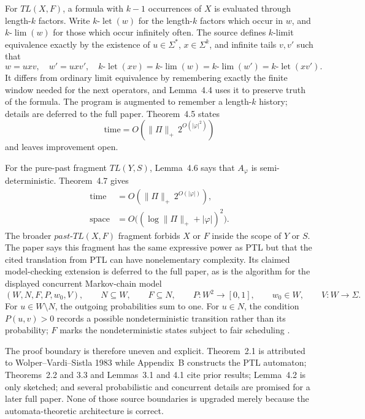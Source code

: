 For \(TL(X,F)\), a formula with \(k-1\) occurrences of \(X\) is evaluated
through length-\(k\) factors.  Write \(k\text{-}\operatorname{let}(w)\) for
the length-\(k\) factors which occur in \(w\), and
\(k\text{-}\operatorname{lim}(w)\) for those which occur infinitely often.
The source defines \(k\)-limit equivalence exactly by the existence of
\(u\in\Sigma^*\), \(x\in\Sigma^k\), and infinite tails \(v,v'\) such that
\[
 w=uxv,
 \quad
 w'=uxv',
 \quad
 k\text{-}\operatorname{let}(xv)
 =k\text{-}\operatorname{lim}(w)
 =k\text{-}\operatorname{lim}(w')
 =k\text{-}\operatorname{let}(xv').
\]
It differs from ordinary limit equivalence by remembering exactly the finite
window needed for the next operators, and Lemma~4.4 uses it to preserve truth
of the formula.  The program is augmented to remember a length-\(k\) history;
details are deferred to the full paper.  Theorem~4.5 states
\[
 \text{time}=O(\lVert\Pi\rVert_+\,2^{O(|\varphi|^2)})
\]
and leaves improvement open.

For the pure-past fragment \(TL(Y,S)\), Lemma~4.6 says that
\(A_\varphi\) is semi-deterministic.  Theorem~4.7 gives
\[
\begin{aligned}
 \text{time}&=O(\lVert\Pi\rVert_+\,2^{O(|\varphi|)}),\\
 \text{space}&=O\bigl((\log\lVert\Pi\rVert_++|\varphi|)^2\bigr).
\end{aligned}
\]
The broader \(past\text{-}TL(X,F)\) fragment forbids \(X\) or \(F\) inside
the scope of \(Y\) or \(S\).  The paper says this fragment has the same
expressive power as PTL but that the cited translation from PTL can have
nonelementary complexity.  Its claimed model-checking extension is deferred
to the full paper, as is the algorithm for the displayed concurrent
Markov-chain model
\[
 (W,N,F,P,w_0,V),
 \qquad
 N\subseteq W,
 \qquad
 F\subseteq N,
 \qquad
 P:W^2\to[0,1],
 \qquad
 w_0\in W,
 \qquad
 V:W\to\Sigma.
\]
For \(u\in W\setminus N\), the outgoing probabilities sum to one.  For
\(u\in N\), the condition \(P(u,v)>0\) records a possible nondeterministic
transition rather than its probability; \(F\) marks the nondeterministic
states subject to fair scheduling
\cite[preprint pp.~10--11]{VardiWolper1986}.

The proof boundary is therefore uneven and explicit.  Theorem~2.1 is
attributed to Wolper--Vardi--Sistla 1983 while Appendix~B constructs the PTL
automaton; Theorems~2.2 and 3.3 and Lemmas~3.1 and 4.1 cite prior results;
Lemma~4.2 is only sketched; and several probabilistic and concurrent details
are promised for a later full paper.  None of those source boundaries is
upgraded merely because the automata-theoretic architecture is correct.


